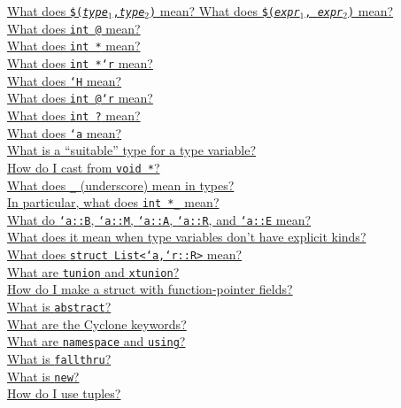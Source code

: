 \ifscreen
\begin{small}
\hyperlink{faq:tuple}{What does \texttt{\$({\it type}$_1$,{\it type}$_2$)} mean?  What does \texttt{\$({\it expr}$_1$, {\it expr}$_2$)} mean?}\\
\hyperlink{faq:non-null}{What does \texttt{int @} mean?}\\
\hyperlink{faq:bounds}{What does \texttt{int *\rb} mean?}\\
\hyperlink{faq:region}{What does \texttt{int *`r} mean?}\\
\hyperlink{faq:heapregion}{What does \texttt{`H} mean?}\\
\hyperlink{faq:boundsregion}{What does \texttt{int @\rb `r} mean?}\\
\hyperlink{faq:questionable}{What does \texttt{int ?} mean?}\\
\hyperlink{faq:typevar}{What does \texttt{`a} mean?}\\
\hyperlink{faq:suitable}{What is a ``suitable'' type for a type variable?}\\
\hyperlink{faq:voidstar}{How do I cast from \texttt{void *}?}\\
\hyperlink{faq:uscore-types}{What does \texttt{_} (underscore) mean in types?}\\
\hyperlink{faq:uscore-region}{In particular, what does \texttt{int *_} mean?}\\
\hyperlink{faq:kinds}{What do \texttt{`a::B}, \texttt{`a::M}, \texttt{`a::A}, \texttt{`a::R}, and \texttt{`a::E} mean?}\\
\hyperlink{faq:nokinds}{What does it mean when type variables don't have explicit kinds?}\\
\hyperlink{faq:list}{What does \texttt{struct List<`a,`r::R>} mean?}\\
\hyperlink{faq:tagged}{What are \texttt{tunion} and \texttt{xtunion}?}\\
\hyperlink{faq:structfp}{How do I make a struct with function-pointer fields?}\\
\hyperlink{faq:abstract}{What is \texttt{abstract}?}\\
\hyperlink{faq:keywords}{What are the Cyclone keywords?}\\
\hyperlink{faq:namespace}{What are \texttt{namespace} and \texttt{using}?}\\
\hyperlink{faq:fallthru}{What is \texttt{fallthru}?}\\
\hyperlink{faq:new}{What is \texttt{new}?}\\
\hyperlink{faq:usetuples}{How do I use tuples?}\\

\end{small}
